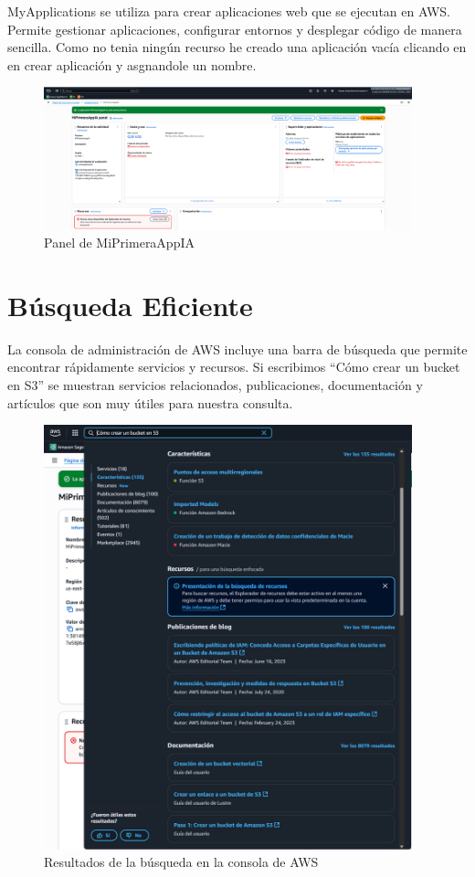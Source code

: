 \documentclass{article}
\begin{document}
	MyApplications se utiliza para crear aplicaciones web que se ejecutan en AWS. Permite gestionar aplicaciones, configurar entornos y desplegar código de manera sencilla. Como no tenia ningún recurso he creado una aplicación vacía clicando en en crear aplicación y asgnandole un nombre.

	\begin{figure}[h!]
	\centering
	\includegraphics[width=0.95\textwidth]{tarea_4.png}
	\caption{Panel de MiPrimeraAppIA}
	\end{figure}

	\newpage

	\section{Búsqueda Eficiente}

	La consola de administración de AWS incluye una barra de búsqueda que permite encontrar rápidamente servicios y recursos. Si escribimos ``Cómo crear un bucket en S3'' se muestran servicios relacionados, publicaciones, documentación y artículos que son muy útiles para nuestra consulta.

	\begin{figure}[h!]
	\centering
	\includegraphics[width=0.95\textwidth]{tarea_5.png}
	\caption{Resultados de la búsqueda en la consola de AWS}
	\end{figure}
\end{document}
